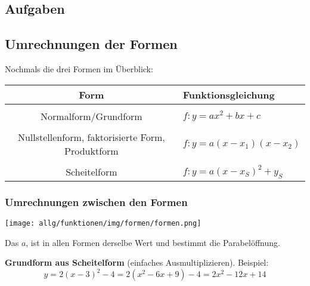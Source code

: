   \subsection*{Aufgaben}

\newpage


\subsection{Umrechnungen der Formen}

Nochmals die drei Formen im Überblick:

\begin{tabular}{c|l}
  Form & Funktionsgleichung\\
  \hline\\
  Normalform/Grundform & $f: y= ax^2 + bx + c$\\
  \hline\\
  Nullstellenform, faktorisierte Form, Produktform & $f: y=a(x-x_1)(x-x_2)$\\
  \hline\\
  Scheitelform & $f: y=a(x-x_S)^2+y_S$\\
  \hline%
\end{tabular}


\subsubsection{Umrechnungen zwischen den Formen}

\begin{center}
  \texttt{[image: allg/funktionen/img/formen/formen.png]}
\end{center}

\begin{bemerkung}{}{}
  Das $a$,  ist in allen Formen derselbe Wert und bestimmt die Parabelöffnung.
  \end{bemerkung}
\newpage

\textbf{Grundform aus Scheitelform} (einfaches Ausmultiplizieren). Beispiel:
$$y=2(x-3)^2-4 = 2(x^2-6x+9)-4=2x^2-12x+14$$

